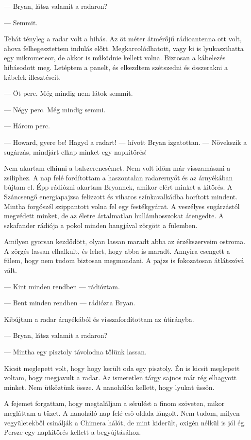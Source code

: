 \documentclass[10pt]{memoir}
\begin{document}
— Bryan, látsz valamit a radaron?

— Semmit.

Tehát tényleg a radar volt a hibás. Az öt méter átmérőjű rádioantenna ott volt,
ahova felhegesztettem indulás előtt. Megkarcolódhatott, vagy ki is
lyukaszthatta egy mikrometeor, de akkor is működnie kellett volna. Biztosan a
kábelezés hibásodott meg. Letéptem a panelt, és elkezdtem szétszedni és
összerakni a kábelek illesztéseit.

— Öt perc. Még mindig nem látok semmit.

— Négy perc. Még mindig semmi.

— Három perc.

— Howard, gyere be! Hagyd a radart! — hívott Bryan izgatottan. — Növekszik a
sugárzás, mindjárt elkap minket egy napkitörés!

Nem akartam elhinni a balszerencsémet. Nem volt időm már visszamászni a
zsiliphez. A nap felé fordítottam a haszontalan radarernyőt és az árnyékában
bújtam el. Épp rádiózni akartam Bryannek, amikor elért minket a kitörés. A
Száncsengő energiapajzsa felizzott és viharos színkavalkádba borított mindent.
Mintha forgószél szippantott volna fel egy festékgyárat. A veszélyes
sugárzástól megvédett minket, de az életre ártalmatlan hullámhosszokat
átengedte. A szkafander rádiója a pokol minden hangjával zörgött a fülemben.

Amilyen gyorsan kezdődött, olyan lassan maradt abba az érzékszerveim ostroma. A
zörgés lassan elhalkult, és lehet, hogy abba is maradt. Annyira csengett a
fülem, hogy nem tudom biztosan megmondani. A pajzs is fokozatosan átlátszóvá
vált.

— Kint minden rendben — rádióztam.

— Bent minden rendben — rádiózta Bryan.

Kibújtam a radar árnyékából és visszafordítottam az útirányba. 

— Bryan, látsz valamit a radaron?

— Mintha egy pisztoly távolodna tőlünk lassan.

Kicsit meglepett volt, hogy hogy került oda egy pisztoly. Én is kicsit
meglepett voltam, hogy megjavult a radar. Az ismeretlen tárgy sajnos már rég
elhagyott minket. Nem ütköztünk össze. A nanohálón kellett, hogy lyukat üssön.

A fejemet forgattam, hogy megtaláljam a sérülést a finom szöveten, mikor
megláttam a tüzet. A nanoháló nap felé eső oldala lángolt. Nem tudom, milyen
vegyületekből csinálják a Chimera hálót, de mint kiderült, oxigén nélkül is jól
ég. Persze egy napkitörés kellett a begyújtásához.
\end{document}
